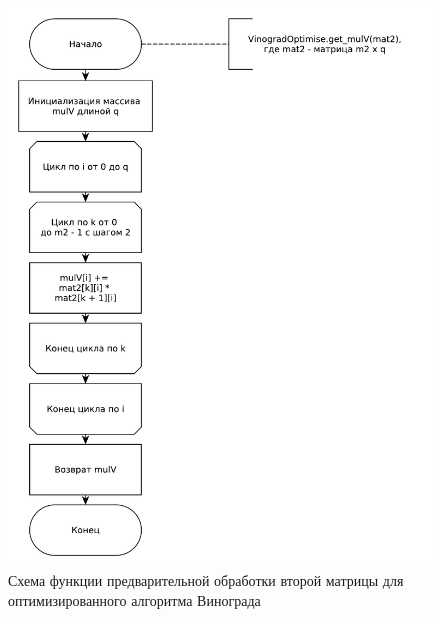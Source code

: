 \documentclass[12pt]{report}
\begin{document}
    \begin{figure}[H]
        \centering
        \includegraphics[width=0.9\linewidth]{img/vinogradOptimise_get_mulv}
        \caption{
                Схема функции предварительной обработки второй матрицы для оптимизированного алгоритма Винограда
        }
        \label{fig:opt_vin_mulv}
    \end{figure}
\end{document}
